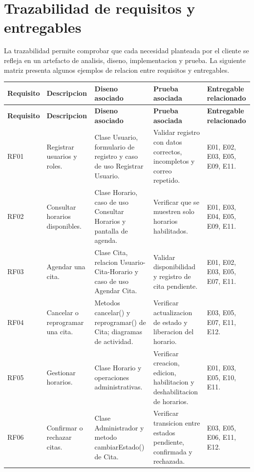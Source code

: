 \documentclass[12pt,letterpaper]{article}
\begin{document}
\section{Trazabilidad de requisitos y entregables}

La trazabilidad permite comprobar que cada necesidad planteada por el cliente se refleja en un artefacto de analisis, diseno, implementacion y prueba. La siguiente matriz presenta algunos ejemplos de relacion entre requisitos y entregables.

\begin{longtable}{|p{2cm}|p{4.2cm}|p{3.4cm}|p{3.3cm}|p{3.5cm}|}
\hline
\textbf{Requisito} & \textbf{Descripcion} & \textbf{Diseno asociado} & \textbf{Prueba asociada} & \textbf{Entregable relacionado} \\
\hline
\endfirsthead
\hline
\textbf{Requisito} & \textbf{Descripcion} & \textbf{Diseno asociado} & \textbf{Prueba asociada} & \textbf{Entregable relacionado} \\
\hline
\endhead
\hline
\endfoot
\hline
\endlastfoot

RF01 & Registrar usuarios y roles. & Clase Usuario, formulario de registro y caso de uso Registrar Usuario. & Validar registro con datos correctos, incompletos y correo repetido. & E01, E02, E03, E05, E09, E11. \\
\hline

RF02 & Consultar horarios disponibles. & Clase Horario, caso de uso Consultar Horarios y pantalla de agenda. & Verificar que se muestren solo horarios habilitados. & E01, E03, E04, E05, E09, E11. \\
\hline

RF03 & Agendar una cita. & Clase Cita, relacion Usuario-Cita-Horario y caso de uso Agendar Cita. & Validar disponibilidad y registro de cita pendiente. & E01, E02, E03, E05, E07, E11. \\
\hline

RF04 & Cancelar o reprogramar una cita. & Metodos cancelar() y reprogramar() de Cita; diagramas de actividad. & Verificar actualizacion de estado y liberacion del horario. & E03, E05, E07, E11, E12. \\
\hline

RF05 & Gestionar horarios. & Clase Horario y operaciones administrativas. & Verificar creacion, edicion, habilitacion y deshabilitacion de horarios. & E01, E03, E05, E10, E11. \\
\hline

RF06 & Confirmar o rechazar citas. & Clase Administrador y metodo cambiarEstado() de Cita. & Verificar transicion entre estados pendiente, confirmada y rechazada. & E03, E05, E06, E11, E12. \\
\hline
\end{longtable}
\end{document}
